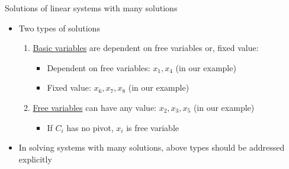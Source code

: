 \documentclass[a4paper,11pt]{article}
\begin{document}
\begin{frame}[t]{Solutions of linear systems with many solutions}
	\begin{itemize}
		\item Two types of solutions
		\begin{enumerate}
			\item \uline{Basic variables} are dependent on free variables or, fixed value:
			\begin{itemize}
				\item Dependent on free variables: $x_1,x_4$ (in our example)
				\item Fixed value: $x_6,x_7,x_8$ (in our example)
			\end{itemize}
			\item \uline{Free variables} can have any value: $x_2,x_3,x_5$ (in our example)
			\begin{itemize}
				\item If $C_i$ has no pivot, $x_i$ is free variable
			\end{itemize}
		\end{enumerate}
		\item In solving systems with many solutions, above types should be addressed explicitly
	\end{itemize}
\end{frame}
\end{document}
